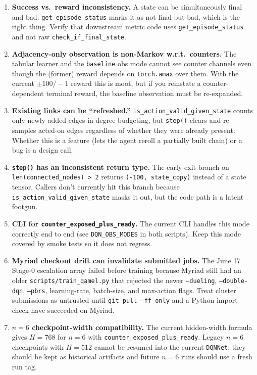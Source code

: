 \documentclass[11pt]{article}
\newcommand{\code}[1]{\texttt{#1}}
\newcommand{\file}[1]{\texttt{\small #1}}
\begin{document}
\begin{enumerate}
  \item \textbf{Success vs.\ reward inconsistency.} A state can be simultaneously final and bad. \code{get\_episode\_status} marks it as not-final-but-bad, which is the right thing. Verify that downstream metric code uses \code{get\_episode\_status} and not raw \code{check\_if\_final\_state}.
  \item \textbf{Adjacency-only observation is non-Markov w.r.t.\ counters.} The tabular learner and the \code{baseline} obs mode cannot see counter channels even though the (former) reward depends on \code{torch.amax} over them. With the current $\pm 100/-1$ reward this is moot, but if you reinstate a counter-dependent terminal reward, the baseline observation must be re-expanded.
  \item \textbf{Existing links can be ``refreshed.''} \code{is\_action\_valid\_given\_state} counts only newly added edges in degree budgeting, but \code{step()} clears and re-samples acted-on edges regardless of whether they were already present. Whether this is a feature (lets the agent reroll a partially built chain) or a bug is a design call.
  \item \textbf{\code{step()} has an inconsistent return type.} The early-exit branch on \code{len(connected\_nodes) > 2} returns \code{(-100, state\_copy)} instead of a state tensor. Callers don't currently hit this branch because \code{is\_action\_valid\_given\_state} masks it out, but the code path is a latent footgun.
  \item \textbf{CLI for \code{counter\_exposed\_plus\_ready}.} The current CLI handles this mode correctly end to end (see \code{DQN\_OBS\_MODES} in both scripts). Keep this mode covered by smoke tests so it does not regress.
  \item \textbf{Myriad checkout drift can invalidate submitted jobs.} The June 17 Stage-0 escalation array failed before training because Myriad still had an older \file{scripts/train\_qamel.py} that rejected the newer \code{--dueling}, \code{--double-dqn}, \code{--pbrs}, learning-rate, batch-size, and max-action flags. Treat cluster submissions as untrusted until \code{git pull --ff-only} and a Python import check have succeeded on Myriad.
  \item \textbf{$n=6$ checkpoint-width compatibility.} The current hidden-width formula gives $H=768$ for $n=6$ with \code{counter\_exposed\_plus\_ready}. Legacy $n=6$ checkpoints with $H=512$ cannot be resumed into the current \code{DQNNet}; they should be kept as historical artifacts and future $n=6$ runs should use a fresh run tag.

\end{enumerate}
\end{document}
